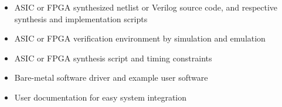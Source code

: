 \begin{itemize}
  \itemsep-0.5em
\item ASIC or FPGA synthesized netlist or Verilog source code, and respective
  synthesis and implementation scripts
\item ASIC or FPGA verification environment by simulation and emulation
\item ASIC or FPGA synthesis script and timing constraints
\item Bare-metal software driver and example user software
\item User documentation for easy system integration
\end{itemize}
